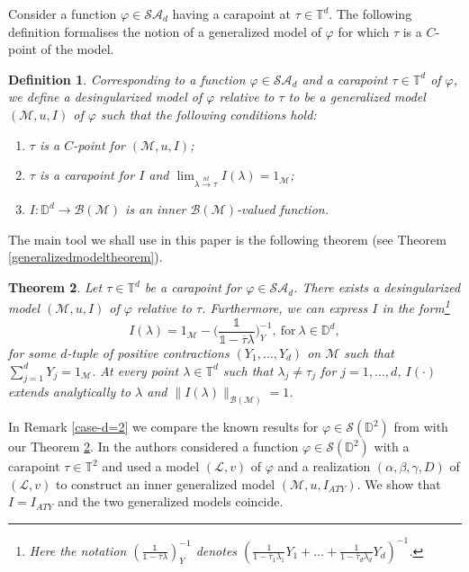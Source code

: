 \documentclass[11pt, reqno]{amsart}
\newtheorem{theorem}{Theorem}[section]
\newtheorem{definition}[theorem]{Definition}
\newcommand\1{\boldsymbol {1}}
\newcommand\m{\mathcal{M}}
\newcommand\lam{\lambda}
\newcommand{\T}{\mathbb{T}}
\newcommand{\D}{\mathbb{D}}
\newcommand{\ph}{\varphi}
\newcommand{\inv}{^{-1}}
\numberwithin{equation}{section}
\begin{document}
Consider a function $\varphi\in\mathcal{SA}_{d}$ having a carapoint at $\tau\in \T^d$.
The following definition formalises the notion of a generalized model of $\varphi$ for which
$\tau$ is a $C$-point of the model.
\begin{definition}\label{desingularized} 
Corresponding to a function $\varphi\in\mathcal{SA}_{d}$ and a carapoint $\tau\in\mathbb{T}^{d}$ of $\varphi$, we define a {\em{desingularized model of $\varphi$ relative to $\tau$}} to be a generalized model $(\mathcal{M},u,I)$ of $\varphi$ such that the following conditions hold:
 \begin{enumerate}
\item $\tau$ is a $C$-point for $(\mathcal{M},u,I)$;
\item $\tau$ is a carapoint for $I$ and $\lim_{\lambda{\overset{nt}\rightarrow}\tau}I(\lambda)=1_{\mathcal{M}}$;
\item $I:\mathbb{D}^{d}\rightarrow \mathcal{B(M)}$ is an inner $\mathcal{B(M)}$-valued function.
\end{enumerate}
\end{definition}
The main tool we shall use in this paper is the following theorem (see Theorem \ref{generalizedmodeltheorem}). 
\begin{theorem}\label{mainExistence-intro}
Let $\tau \in\mathbb{T}^{d}$ be a carapoint for $\varphi \in\mathcal{SA}_{d}$. There exists a 
desingularized model $(\mathcal{M},u,I)$ of $\varphi$ relative to $\tau$. 
Furthermore, we can express $I$ in the form\footnote{Here the notation $\left(\frac{\mathds{1}}{\mathds{1}-\bar\tau\lam}\right)_Y\inv$ denotes $\left( \frac{1}{1-\bar\tau_1\lam_1}Y_1+\dots+\frac{1}{1-\bar\tau_d\lam_d}Y_d \right)\inv$.}
\begin{equation}\label{Ioperatorgeneralizedmodel-intro}
I(\lambda) = 1_{\mathcal{M}} - \bigg( \dfrac{\mathds{1}}{\mathds{1}-\overline{\tau}\lambda}\bigg)_{Y}^{-1}, \  \text{for} \ \lambda \in \mathbb{D}^{d},
\end{equation}
for some $d$-tuple of positive contractions $(Y_{1},\hdots,Y_{d})$ on $\mathcal{M}$ such that $\sum_{j=1}^{d}Y_{j}=1_{\mathcal{M}}$.  At every point $\lambda\in\mathbb{T}^{d}$ such that $\lambda_{j}\neq\tau_{j}$ for $j=1,\hdots,d$, $I(\cdot)$ extends analytically to $\lambda$ and $\|I(\lambda)\|_{\mathcal{B(M)}}=1$.
\end{theorem}


In Remark \ref{case-d=2} we compare the known results for $\ph\in\mathcal{S}(\D^2)$ from \cite{ATY2} with our Theorem \ref{mainExistence-intro}. In \cite[Theorem 3.6]{ATY2} the authors considered a function 
$\ph\in\mathcal{S}(\D^2)$ with a carapoint $\tau \in \T^2$  and used a model $(\mathcal{L},v)$ of $\varphi$ and a realization $(\alpha,\beta, \gamma, D)$ of $(\mathcal{L},v)$ to construct an inner generalized model $(\m,u,I_{ATY})$. We show that 
 $I=I_{ATY}$ and the two generalized models coincide.
\end{document}
